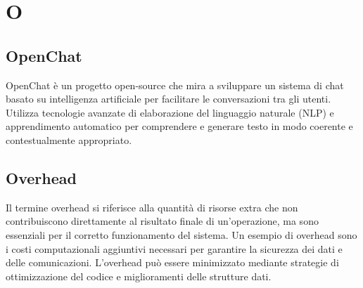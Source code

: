 \section{O}

\vspace{2em}
\subsection*{OpenChat}
\par OpenChat è un progetto open-source che mira a sviluppare un sistema di chat basato su intelligenza artificiale per facilitare le conversazioni tra gli utenti. Utilizza tecnologie avanzate di elaborazione del linguaggio naturale (NLP) e apprendimento automatico per comprendere e generare testo in modo coerente e contestualmente appropriato.

\vspace{2em}
\subsection*{Overhead}
\par Il termine overhead si riferisce alla quantità di risorse extra che non contribuiscono direttamente al risultato finale di un'operazione, ma sono essenziali per il corretto funzionamento del sistema. Un esempio di overhead sono i costi computazionali aggiuntivi necessari per garantire la sicurezza dei dati e delle comunicazioni. L'overhead può essere minimizzato mediante strategie di ottimizzazione del codice e miglioramenti delle strutture dati.

